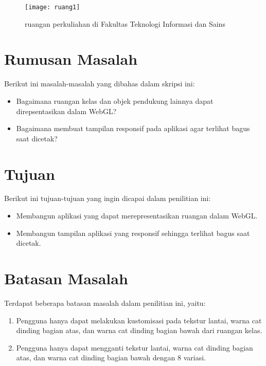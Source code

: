 \begin{figure}
	\texttt{[image: ruang1]}
	\caption{ruangan perkuliahan di Fakultas Teknologi Informasi dan Sains}
\end{figure}

\section{Rumusan Masalah}
\label{sec:rumusan}
Berikut ini masalah-masalah yang dibahas dalam skripsi ini:
\begin{itemize}
    \item Bagaimana ruangan kelas dan objek pendukung lainnya dapat direpsentasikan dalam WebGL?
    \item Bagaimana membuat tampilan responsif pada aplikasi agar terlihat bagus saat dicetak?
\end{itemize}

\section{Tujuan}
\label{sec:tujuan}
Berikut ini tujuan-tujuan yang ingin dicapai dalam penilitian ini:
\begin{itemize}
    \item Membangun aplikasi yang dapat merepresentasikan ruangan dalam WebGL.
    \item Membangun tampilan aplikasi yang responsif sehingga terlihat bagus saat dicetak.
\end{itemize}

\section{Batasan Masalah}
\label{sec:batasan}
Terdapat beberapa batasan masalah dalam penilitian ini, yaitu:
\begin{enumerate}
    \item Pengguna hanya dapat melakukan kustomisasi pada tekstur lantai, warna cat dinding bagian atas, dan warna cat dinding bagian bawah dari ruangan kelas.
    \item Pengguna hanya dapat mengganti tekstur lantai, warna cat dinding bagian atas, dan warna cat dinding bagian bawah dengan 8 variasi.
\end{enumerate}
